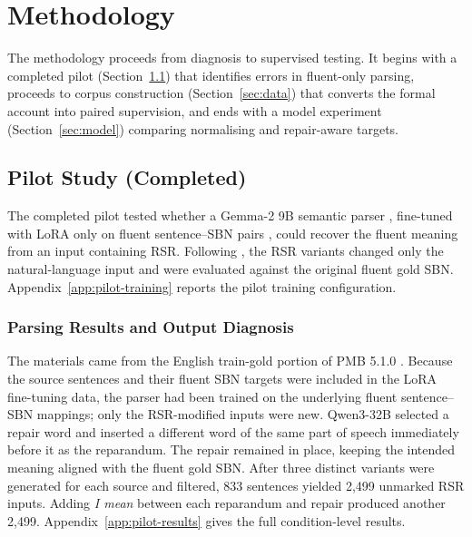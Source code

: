 \section{Methodology}
\label{sec:methodology}

The methodology proceeds from diagnosis to supervised testing. It begins with
a completed pilot (Section~\ref{sec:pilot}) that identifies errors in
fluent-only parsing, proceeds to corpus construction (Section~\ref{sec:data})
that converts the formal account into paired supervision, and ends with a model
experiment (Section~\ref{sec:model}) comparing normalising and repair-aware
targets.

\subsection{Pilot Study (Completed)}
\label{sec:pilot}

The completed pilot tested whether a Gemma-2 9B semantic parser
\citep{gemmateamGemma2Improving2024}, fine-tuned with LoRA only on fluent
sentence--SBN pairs \citep{huLoRALowRankAdaptation2021}, could recover the
fluent meaning from an input containing RSR. Following
\citet{senSemanticParsingDisfluent2021}, the RSR variants changed only the
natural-language input and were evaluated against the original fluent gold
SBN. Appendix~\ref{app:pilot-training}
reports the pilot training configuration.

\subsubsection{Parsing Results and Output Diagnosis}

The materials came from the English train-gold portion of PMB 5.1.0
\citep{abzianidzeParallelMeaningBank2017}. Because the source sentences and
their fluent SBN targets were included in the LoRA fine-tuning data, the parser
had been trained on the underlying fluent sentence--SBN mappings; only the
RSR-modified inputs were new. Qwen3-32B
\citep{yangQwen3TechnicalReport2025} selected a repair word and inserted a
different word of the same part of speech immediately before it as the
reparandum. The repair remained in place, keeping the intended meaning aligned
with the fluent gold SBN. After three distinct variants were generated for each source
and filtered, 833 sentences yielded 2,499 unmarked RSR inputs. Adding
\textit{I mean} between each reparandum and repair produced another 2,499.
Appendix~\ref{app:pilot-results} gives the full condition-level
results.

